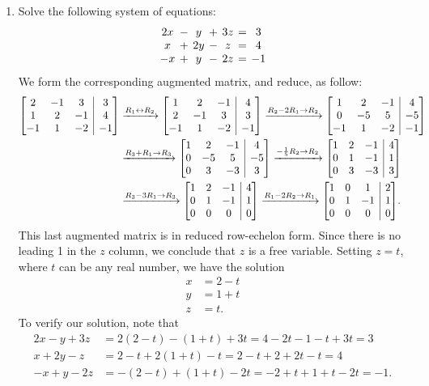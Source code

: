 \documentclass[12pt]{article}
\makeatletter
\newenvironment{amatrix}[1]{%
  \left[\begin{array}{@{}*{#1}{c}|c@{}}
}{%
  \end{array}\right]
}
\newcommand{\bam}{\begin{amatrix}}
\newcommand{\eam}{\end{amatrix}}
\makeatother
\begin{document}
\begin{enumerate}
\bigskip

\item Solve the following system of equations:
\[
 \arraycolsep=2pt \begin{array}{ccccccc}
                   2x&-&y&+&3z&=&3\\x&+&2y&-&z&=&4\\-x&+&y&-&2z&=&-1
                  \end{array}
\]
We form the corresponding augmented matrix, and reduce, as follow:
\begin{align*}
 \bam{3}2&-1&3&3\\1&2&-1&4\\-1&1&-2&-1\eam &\xrightarrow{R_1\leftrightarrow R_2} \bam{3}1&2&-1&4\\2&-1&3&3\\-1&1&-2&-1\eam \xrightarrow{R_2-2R_1\to R_2} \bam{3}1&2&-1&4\\0&-5&5&-5\\-1&1&-2&-1\eam\\
 &\xrightarrow{R_3+R_1\to R_3}\bam{3}1&2&-1&4\\0&-5&5&-5\\0&3&-3&3\eam \xrightarrow{-\frac{1}{5}R_2\to R_2}\bam{3}1&2&-1&4\\0&1&-1&1\\0&3&-3&3\eam\\
 &\xrightarrow{R_3-3R_1\to R_3}\bam{3}1&2&-1&4\\0&1&-1&1\\0&0&0&0\eam \xrightarrow{R_1-2R_2\to R_1}\bam{3}1&0&1&2\\0&1&-1&1\\0&0&0&0\eam. 
\end{align*}
This last augmented matrix is in reduced row-echelon form. Since there is no leading 1 in the $z$ column, we conclude that $z$ is a free variable. Setting $z=t$, where $t$ can be any real number, we have the solution
\begin{align*}
 x&=2-t\\y&=1+t\\z&=t.
\end{align*}
To verify our solution, note that
\begin{align*}
 2x-y+3z & = 2(2-t)-(1+t)+3t = 4-2t-1-t+3t = 3\\
 x+2y-z & = 2-t+2(1+t)-t = 2-t+2+2t-t=4\\
 -x+y-2z & = -(2-t)+(1+t)-2t = -2+t+1+t-2t = -1.
\end{align*}


 \end{enumerate}
\end{document}
